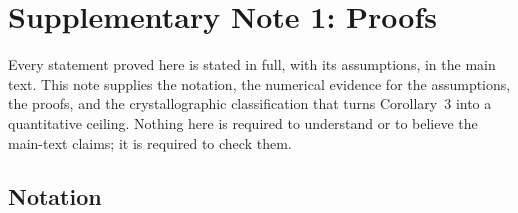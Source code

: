 
\setlength{\tabcolsep}{3pt}

\section*{Supplementary Note 1: Proofs}


Every statement proved here is stated in full, with its assumptions, in the main text. This note supplies the notation, the numerical evidence for the assumptions, the proofs, and the crystallographic classification that turns Corollary~3 into a quantitative ceiling. Nothing here is required to understand or to believe the main-text claims; it is required to check them.

\subsection*{Notation}

